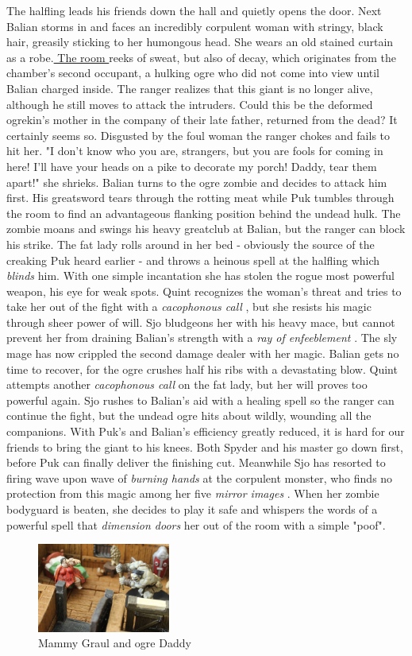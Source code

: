 The halfling leads his friends down the hall and quietly opens the door. Next Balian storms in and faces an incredibly corpulent woman with stringy, black hair, greasily sticking to her humongous head. She wears an old stained curtain as a robe.\hyperref[fig:Mammy-Graul-and-ogre-Daddy-507696824]{ The room } reeks of sweat, but also of decay, which originates from the chamber's second occupant, a hulking ogre who did not come into view until Balian charged inside. The ranger realizes that this giant is no longer alive, although he still moves to attack the intruders. Could this be the deformed ogrekin's mother in the company of their late father, returned from the dead? It certainly seems so. Disgusted by the foul woman the ranger chokes and fails to hit her. "I don't know who you are, strangers, but you are fools for coming in here! I'll have your heads on a pike to decorate my porch! Daddy, tear them apart!" she shrieks. Balian turns to the ogre zombie and decides to attack him first. His greatsword tears through the rotting meat while Puk tumbles through the room to find an advantageous flanking position behind the undead hulk. The zombie moans and swings his heavy greatclub at Balian, but the ranger can block his strike. The fat lady rolls around in her bed - obviously the source of the creaking Puk heard earlier - and throws a heinous spell at the halfling which  {\itshape blinds} him. With one simple incantation she has stolen the rogue most powerful weapon, his eye for weak spots. Quint recognizes the woman's threat and tries to take her out of the fight with a  {\itshape cacophonous call} , but she resists his magic through sheer power of will. Sjo bludgeons her with his heavy mace, but cannot prevent her from draining Balian's strength with a  {\itshape ray of enfeeblement} . The sly mage has now crippled the second damage dealer with her magic. Balian gets no time to recover, for the ogre crushes half his ribs with a devastating blow. Quint attempts another  {\itshape cacophonous call} on the fat lady, but her will proves too powerful again. Sjo rushes to Balian's aid with a healing spell so the ranger can continue the fight, but the undead ogre hits about wildly, wounding all the companions. With Puk's and Balian's efficiency greatly reduced, it is hard for our friends to bring the giant to his knees. Both Spyder and his master go down first, before Puk can finally deliver the finishing cut. Meanwhile Sjo has resorted to firing wave upon wave of  {\itshape burning hands} at the corpulent monster, who finds no protection from this magic among her five  {\itshape mirror images} . When her zombie bodyguard is beaten, she decides to play it safe and whispers the words of a powerful spell that  {\itshape dimension doors} her out of the room with a simple "poof". \\

\begin{figure}[h]
	\centering
	\includegraphics[width=0.39\textwidth]{images/Mammy-Graul-and-ogre-Daddy-507696824.jpg}
	\caption{Mammy Graul and ogre Daddy}
	\label{fig:Mammy-Graul-and-ogre-Daddy-507696824}
\end{figure}


